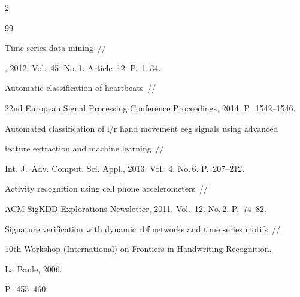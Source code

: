 \begin{multicols}{2}
{{\begin{thebibliography}{99}




Time-series data mining~//


, 2012. Vol.~45. No.\,1. Article~12. P.~1--34.









Automatic classification of heartbeats~//


{22nd European Signal Processing Conference Proceedings}, 2014. P.~1542--1546.









 Automated classification of l/r hand movement eeg signals using advanced 


 feature extraction and machine learning~//


{Int. J.~Adv. Comput. Sci. Appl.}, 2013. Vol.~4. No.\,6. P.~207--212.









Activity recognition using cell phone accelerometers~//


{ACM SigKDD Explorations Newsletter}, 2011. Vol.~12. No.\,2. P.~74--82.









 Signature verification with dynamic rbf networks and time series motifs~//


{10th  Workshop (International) on Frontiers in Handwriting Recognition}.


 La Baule, 2006. 


P.~455--460.










\end{thebibliography}}}
\end{multicols}
